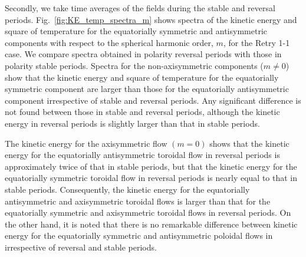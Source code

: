 Secondly, we take time averages of the fields during the stable and reversal periods. 
Fig.~\ref{fig:KE_temp_spectra_m} shows spectra of the kinetic energy and square of temperature for the equatorially symmetric and antisymmetric components
with respect to the spherical harmonic order, $m$, for the Retry 1-1 case.
We compare spectra obtained in polarity reversal periods with those in polarity stable periods.
Spectra for the non-axisymmetric components ($m \ne 0$) show that the kinetic energy and square of temperature for the equatorially symmetric component are larger than those for the equatorially antisymmetric component irrespective of stable and reversal periods.
Any significant difference is not found between those in stable and reversal periods, although the kinetic energy in reversal periods is slightly larger than that in stable periods.

The kinetic energy for the axisymmetric flow $(m = 0)$ shows that the kinetic energy for the equatorially antisymmetric toroidal flow in reversal periods is approximately twice of that in stable periods, but that the kinetic energy for the equatorially symmetric toroidal flow in reversal periods is nearly equal to that in stable periods.
Consequently, the kinetic energy for the equatorially antisymmetric and axisymmetric toroidal flows is larger than that for the equatorially symmetric and  axisymmetric toroidal flows in reversal periods.
On the other hand,
it is noted that there is no remarkable difference between kinetic energy for the equatorially symmetric and antisymmetric poloidal flows in irrespective of reversal and stable periods.

